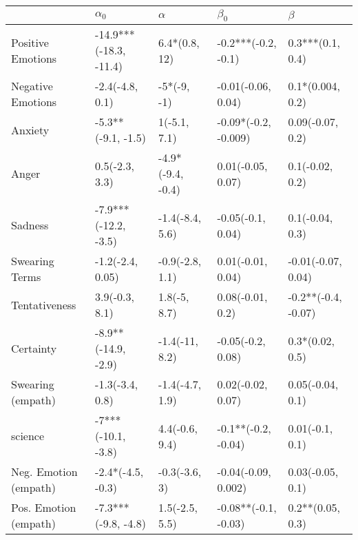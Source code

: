 \begin{tabular}{lllll}
\toprule
{} &              $\alpha_0$ &           $\alpha$ &             $\beta_0$ &              $\beta$ \\
\midrule
Positive Emotions     &  -14.9***(-18.3, -11.4) &      6.4*(0.8, 12) &   -0.2***(-0.2, -0.1) &     0.3***(0.1, 0.4) \\
Negative Emotions     &         -2.4(-4.8, 0.1) &        -5*(-9, -1) &    -0.01(-0.06, 0.04) &     0.1*(0.004, 0.2) \\
Anxiety               &      -5.3**(-9.1, -1.5) &       1(-5.1, 7.1) &  -0.09*(-0.2, -0.009) &     0.09(-0.07, 0.2) \\
Anger                 &          0.5(-2.3, 3.3) &  -4.9*(-9.4, -0.4) &     0.01(-0.05, 0.07) &      0.1(-0.02, 0.2) \\
Sadness               &    -7.9***(-12.2, -3.5) &    -1.4(-8.4, 5.6) &     -0.05(-0.1, 0.04) &      0.1(-0.04, 0.3) \\
Swearing Terms        &        -1.2(-2.4, 0.05) &    -0.9(-2.8, 1.1) &     0.01(-0.01, 0.04) &   -0.01(-0.07, 0.04) \\
Tentativeness         &          3.9(-0.3, 8.1) &       1.8(-5, 8.7) &      0.08(-0.01, 0.2) &  -0.2**(-0.4, -0.07) \\
Certainty             &     -8.9**(-14.9, -2.9) &     -1.4(-11, 8.2) &     -0.05(-0.2, 0.08) &      0.3*(0.02, 0.5) \\
Swearing (empath)     &         -1.3(-3.4, 0.8) &    -1.4(-4.7, 1.9) &     0.02(-0.02, 0.07) &     0.05(-0.04, 0.1) \\
science               &      -7***(-10.1, -3.8) &     4.4(-0.6, 9.4) &   -0.1**(-0.2, -0.04) &      0.01(-0.1, 0.1) \\
Neg. Emotion (empath) &       -2.4*(-4.5, -0.3) &      -0.3(-3.6, 3) &   -0.04(-0.09, 0.002) &     0.03(-0.05, 0.1) \\
Pos. Emotion (empath) &     -7.3***(-9.8, -4.8) &     1.5(-2.5, 5.5) &  -0.08**(-0.1, -0.03) &     0.2**(0.05, 0.3) \\
\bottomrule
\end{tabular}

